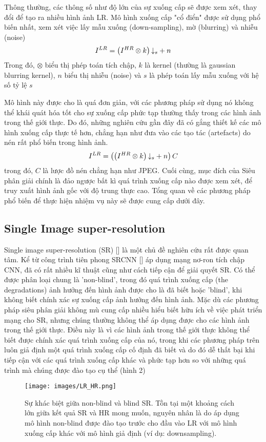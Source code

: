 \documentclass[conference]{IEEEtran}
\begin{document}
Thông thường, các thông số như độ lớn của sự xuống cấp sẽ được xem xét, thay đổi để tạo ra nhiều hình ảnh LR. Mô hình xuống cấp "cổ điển" được sử dụng phổ biến nhất, xem xét việc lấy mẫu xuống (down-sampling), mờ
(blurring) và nhiễu (noise)
\begin{align}
    {I^{LR}} = \left( {{I^{HR}} \otimes k} \right){ \downarrow _s} + n
    {\label{1.1}}
\end{align}
Trong đó, $\otimes$ biểu thị phép toán tích chập, $k$ là kernel (thường là gaussian blurring kernel), $n$ biểu thị nhiễu (noise) và $s$ là phép toán lấy mẫu xuống với hệ số tỷ lệ $s$

Mô hình này được cho là quá đơn giản, với các phương pháp sử dụng nó không thể khái quát hóa tốt cho sự xuống cấp phức tạp thường thấy trong các hình ảnh trong thế giới thực. Do đó, những nghiên cứu gần đây đã có gắng thiết kế các mô hình xuống cấp thực tế hơn, chẳng hạn như đưa vào các tạo tác (artefacts) do nén rất phổ biến trong hình ảnh.
\begin{align}
    {I^{LR}} = \left( {\left( {{I^{HR}} \otimes k} \right){ \downarrow _s} + n} \right)C 
    {\label{1.2}}
\end{align}
trong đó, $C$ là lược đồ nén chẳng hạn như JPEG. Cuối cùng, mục đích của Siêu phân giải chính là đảo ngược bất kì quá trình xuống cấp nào được xem xét, để truy xuất hình ảnh gốc với độ trung thực cao. Tổng quan về các phương pháp phổ biến để thực hiện nhiệm vụ này sẽ được cung cấp dưới đây.

\subsection{Single Image super-resolution}
Single image super-resolution (SR) [] là một chủ đề nghiên cứu rất được quan tâm. Kể từ công trình tiên phong SRCNN [] áp dụng mạng nơ-ron tích chập CNN, đã có rất nhiều kĩ thuật cũng như cách tiếp cận để giải quyết SR. Có thể được phân loại chung là 'non-blind', trong đó quá trình xuống cấp (the degradations) ảnh hưởng đến hình ảnh được cho là đã biết hoặc 'blind', khi không biết chính xác sự xuống cấp ảnh hưởng đến hình ảnh. Mặc dù các phương pháp siêu phân giải không mù cung cấp nhiều hiểu biết hữu ích về việc phát triển mạng cho SR, nhưng chúng thường không thể áp dụng được cho các hình ảnh trong thế giới thực. Điều này
là vì các hình ảnh trong thế giới thực không thể biết được chính xác quá trình xuống cấp của nó, trong khi các phương pháp trên luôn giả định một quá trình xuống cấp cố định đã biết và do đó dễ thất bại khi tiếp cận với các quá trình xuống cấp khác và phức tạp hơn so với những quá trình mà chúng được đào tạo cụ thể (hình 2)
\begin{figure} [!t]
    \centering
    \texttt{[image: images/LR\_HR.png]}
    \caption{Sự khác biệt giữa non-blind và blind SR. Tồn tại một khoảng cách lớn giữa kết quả SR và HR mong muốn, nguyên nhân là do áp dụng mô hình non-blind được đào tạo trước cho đầu vào LR với mô hình xuống cấp khác với mô hình giả định (ví dụ: downsampling).}
    \label{fig:2}
\end{figure}
\end{document}

